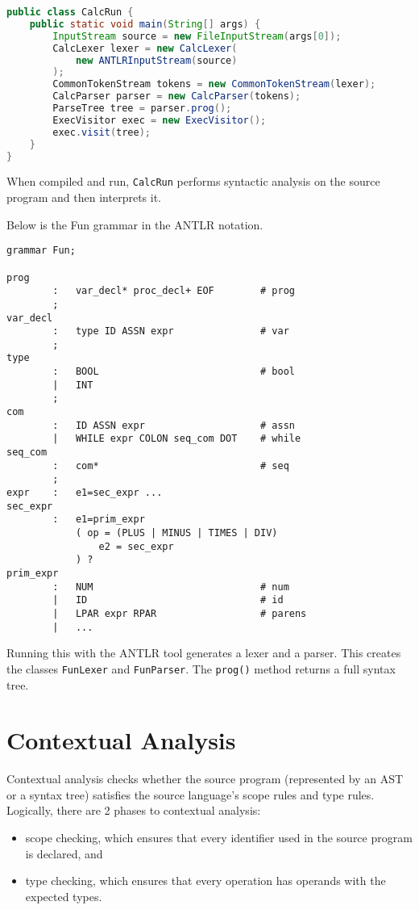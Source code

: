 \documentclass[a4paper, openany]{memoir}
\begin{document}
\begin{lstlisting}[language=java]
public class CalcRun {
    public static void main(String[] args) {
        InputStream source = new FileInputStream(args[0]);
        CalcLexer lexer = new CalcLexer(
            new ANTLRInputStream(source)
        );
        CommonTokenStream tokens = new CommonTokenStream(lexer);
        CalcParser parser = new CalcParser(tokens);
        ParseTree tree = parser.prog();
        ExecVisitor exec = new ExecVisitor();
        exec.visit(tree);
    }
}
\end{lstlisting}
When compiled and run, \texttt{CalcRun} performs syntactic analysis on the source program and then interprets it.

Below is the Fun grammar in the ANTLR notation.
\begin{lstlisting}
grammar Fun;

prog    
        :   var_decl* proc_decl+ EOF        # prog
        ;
var_decl
        :   type ID ASSN expr               # var
        ;
type
        :   BOOL                            # bool
        |   INT
        ;
com
        :   ID ASSN expr                    # assn
        |   WHILE expr COLON seq_com DOT    # while
seq_com
        :   com*                            # seq
        ;
expr    :   e1=sec_expr ...
sec_expr
        :   e1=prim_expr
            ( op = (PLUS | MINUS | TIMES | DIV)
                e2 = sec_expr
            ) ?
prim_expr
        :   NUM                             # num
        |   ID                              # id
        |   LPAR expr RPAR                  # parens
        |   ...
\end{lstlisting}
Running this with the ANTLR tool generates a lexer and a parser. This creates the classes \texttt{FunLexer} and \texttt{FunParser}. The \texttt{prog()} method returns a full syntax tree.
\newpage

\section{Contextual Analysis}
Contextual analysis checks whether the source program (represented by an AST or a syntax tree) satisfies the source language's scope rules and type rules. Logically, there are 2 phases to contextual analysis:
\begin{itemize}
    \item scope checking, which ensures that every identifier used in the source program is declared, and
    \item type checking, which ensures that every operation has operands with the expected types.
\end{itemize}
\end{document}
